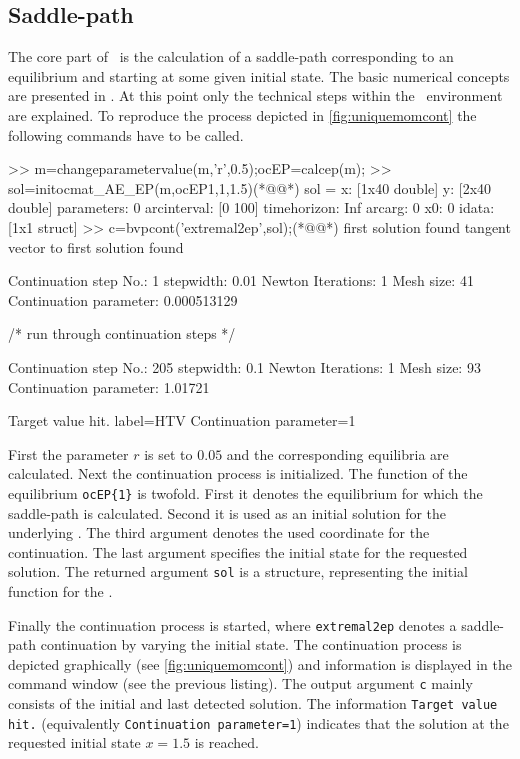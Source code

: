 \subsection{Saddle-path}
\label{sec:numanalysis_saddlepath}
The core part of \OCMAT\ is the calculation of a saddle-path corresponding to an equilibrium and starting at some given initial state. The basic numerical concepts are presented in \citet{grass2012}. At this point only the technical steps within the \OCMAT\ environment are explained. To reproduce the process depicted in \cref{fig:uniquemomcont} the following commands have to be called. 
\begin{matlab} 
>> m=changeparametervalue(m,'r',0.5);ocEP=calcep(m);
>> sol=initocmat_AE_EP(m,ocEP{1},1,1.5)(*@@*)
sol = 
              x: [1x40 double]
              y: [2x40 double]
     parameters: 0
    arcinterval: [0 100]
    timehorizon: Inf
         arcarg: 0
             x0: 0
          idata: [1x1 struct]
>> c=bvpcont('extremal2ep',sol);(*@@*)
first solution found
tangent vector to first solution found

 Continuation step No.: 1
 stepwidth: 0.01
 Newton Iterations: 1
 Mesh size: 41
 Continuation parameter: 0.000513129

/* run through continuation steps */

 Continuation step No.: 205
 stepwidth: 0.1
 Newton Iterations: 1
 Mesh size: 93
 Continuation parameter: 1.01721

 Target value hit.
 label=HTV
 Continuation parameter=1
\end{matlab}
First the parameter $r$ is set to $0.05$ and the corresponding equilibria are calculated. Next the continuation process is initialized. The function of the equilibrium \lstinline+ocEP{1}+ is twofold. First it denotes the equilibrium for which the saddle-path is calculated. Second it is used as an initial solution for the underlying \BVP. The third argument denotes the used coordinate for the continuation. The last argument specifies the initial state for the requested solution. The returned argument \lstinline+sol+ is a structure, representing the initial function for the \BVP. 

Finally the continuation process is started, where \lstinline+extremal2ep+ denotes a saddle-path continuation by varying the initial state. The continuation process is depicted graphically (see \cref{fig:uniquemomcont}) and information is displayed in the command window (see the previous listing). The output argument \lstinline+c+ mainly consists of the initial and last detected solution. The information \lstinline+Target value hit.+ (equivalently \lstinline+Continuation parameter=1+) indicates that the solution at the requested initial state $x=1.5$ is reached.

